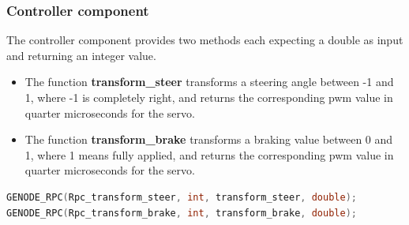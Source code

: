 \subsubsection{Controller component}
\label{sec:comp-controller}

The controller component provides two methods each expecting a double as input and returning an integer value.
\begin{itemize}
\item The function \textbf{transform\_steer} transforms a steering angle between -1 and 1, where -1 is completely right, and returns the corresponding pwm value in quarter microseconds for the servo.
\item The function \textbf{transform\_brake} transforms a braking value between 0 and 1, where 1 means fully applied, and returns the corresponding pwm value in quarter microseconds for the servo.
\end{itemize}

\begin{lstlisting}[language=c, frame=single, basicstyle=\footnotesize, caption=Genode interface for controller component]
GENODE_RPC(Rpc_transform_steer, int, transform_steer, double);
GENODE_RPC(Rpc_transform_brake, int, transform_brake, double);
\end{lstlisting}